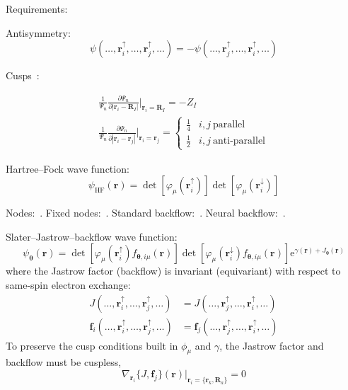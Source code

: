 Requirements:

Antisymmetry:
\begin{equation}
\psi(\ldots,\mathbf r_i^\uparrow,\ldots,\mathbf r_j^\uparrow,\ldots)
  =-\psi(\ldots,\mathbf r_j^\uparrow,\ldots,\mathbf r_i^\uparrow,\ldots)
\end{equation}

Cusps~\citep{KatoCPAM57}:

\begin{equation}
\begin{gathered}
\frac1{\Psi_n}
  \frac{\partial\Psi_n}
  {\partial|\mathbf r_i-\mathbf R_I|}\bigg|_{\mathbf r_i=\mathbf R_I}
  =-Z_I \\
\frac1{\Psi_n}
  \frac{\partial\Psi_n}
  {\partial|\mathbf r_i-\mathbf r_j|}\bigg|_{\mathbf r_i=\mathbf r_j}
  =\begin{cases}
    \frac14 & i, j\ \text{parallel} \\
    \frac12 & i, j\ \text{anti-parallel}
  \end{cases}
\end{gathered}
\end{equation}

Hartree--Fock wave function:
\begin{equation}
\psi_\mathrm{HF}(\mathbf r)
  =\det[\varphi_\mu(\mathbf r_i^\uparrow)]
  \det[\varphi_\mu(\mathbf r_i^\downarrow)]
\end{equation}

Nodes:~\cite{CeperleyJSP91}.
Fixed nodes:~\cite{CeperleyPRL80}.
Standard backflow:~\cite{LopezRiosPRE06}.
Neural backflow:~\cite{LuoPRL19}.

Slater--Jastrow--backflow wave function:
\begin{equation}
\psi_{\boldsymbol\theta}(\mathbf r)=
\det[\varphi_\mu(\mathbf r_i^\uparrow)
  f_{\boldsymbol\theta,i\mu}(\mathbf r)]
\det[\varphi_\mu(\mathbf r_i^\downarrow)
  f_{\boldsymbol\theta,i\mu}(\mathbf r)]
\mathrm e^{\gamma(\mathbf r)+J_{\boldsymbol\theta}(\mathbf r)}
\end{equation}
where the Jastrow factor (backflow) is invariant (equivariant) with respect to same-spin electron exchange:
\begin{equation}
\begin{aligned}
J(\ldots,\mathbf r_i^\uparrow,\ldots,\mathbf r_j^\uparrow,\ldots)
&=J(\ldots,\mathbf r_j^\uparrow,\ldots,\mathbf r_i^\uparrow,\ldots) \\
\mathbf f_i(\ldots,\mathbf r_i^\uparrow,
  \ldots,\mathbf r_j^\uparrow,\ldots)
&=\mathbf f_j(\ldots,\mathbf r_j^\uparrow,
  \ldots,\mathbf r_i^\uparrow,\ldots)
\end{aligned}
\end{equation}
To preserve the cusp conditions built in $\phi_\mu$ and $\gamma$, the Jastrow factor and backflow must be cuspless,
\begin{equation}
\nabla_{\mathbf r_i}\{J,\mathbf f_j\}(\mathbf r)
  \big\rvert_{\mathbf r_i=\{\mathbf r_k,\mathbf R_a\}}=0
\end{equation}

